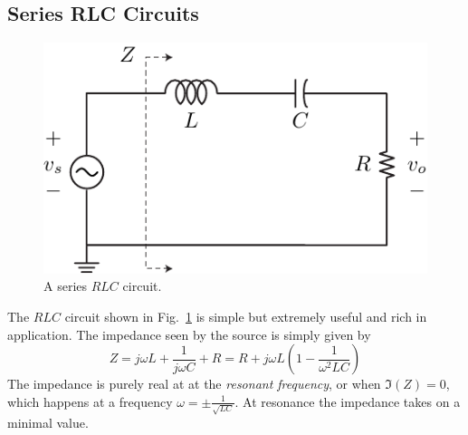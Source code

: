 \subsection{Series RLC Circuits} \label{sec:lcr}
\begin{figure}
\begin{center}
\includegraphics[scale=1]{rlc}
\end{center}
\caption{A series $RLC$ circuit.}
\label{fig:rlc}
\end{figure}
The $RLC$ circuit shown in Fig.~\ref{fig:rlc} is simple but extremely useful and rich in application.  The impedance seen by the source is simply given by
    \begin{equation}
        Z = j\omega L + \frac{1}{j\omega C} + R 
          = R + j\omega L \left( 1 - \frac{1}{\omega^2 LC}\right) 
    \end{equation}
The impedance is purely real at at the \emph{resonant frequency}, or
when $\Im(Z) = 0$, which happens at a frequency $\omega = \pm \frac{1}{\sqrt{L C}}$.  At resonance the impedance takes on a minimal value.  
